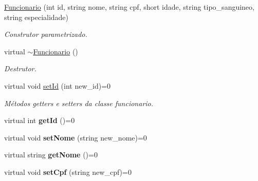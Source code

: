 \begin{DoxyCompactItemize}
\item 
\mbox{\label{class_funcionario_a54eff00da56c5217b50f9e6f6193650d}} 
\mbox{\hyperlink{class_funcionario_a54eff00da56c5217b50f9e6f6193650d}{Funcionario}} (int id, string nome, string cpf, short idade, string tipo\+\_\+sanguineo, string especialidade)
\begin{DoxyCompactList}\small\item\em Construtor parametrizado. \end{DoxyCompactList}\item 
\mbox{\label{class_funcionario_a800273bd909dc88f821a414abebc442c}} 
virtual \mbox{\hyperlink{class_funcionario_a800273bd909dc88f821a414abebc442c}{$\sim$\+Funcionario}} ()
\begin{DoxyCompactList}\small\item\em Destrutor. \end{DoxyCompactList}\item 
\mbox{\label{class_funcionario_aabcee2d8617c88ba10bb7b6f3f7f41ac}} 
virtual void \mbox{\hyperlink{class_funcionario_aabcee2d8617c88ba10bb7b6f3f7f41ac}{set\+Id}} (int new\+\_\+id)=0
\begin{DoxyCompactList}\small\item\em Métodos getters e setters da classe funcionario. \end{DoxyCompactList}\item 
\mbox{\label{class_funcionario_af853519f9ec982d9f85c048a7dda38dc}} 
virtual int {\bfseries get\+Id} ()=0
\item 
\mbox{\label{class_funcionario_acd1f07a600335e7a2bb943f8a3a6d2ad}} 
virtual void {\bfseries set\+Nome} (string new\+\_\+nome)=0
\item 
\mbox{\label{class_funcionario_a868e87abc050eca024235d2c4d107baa}} 
virtual string {\bfseries get\+Nome} ()=0
\item 
\mbox{\label{class_funcionario_a462568bcb0c369f329f2dd8de0160855}} 
virtual void {\bfseries set\+Cpf} (string new\+\_\+cpf)=0
\item 
\mbox{\label{class_funcionario_abcc7aaf45fb8130ad2788f48ed7c297c}} 

\end{DoxyCompactItemize}
